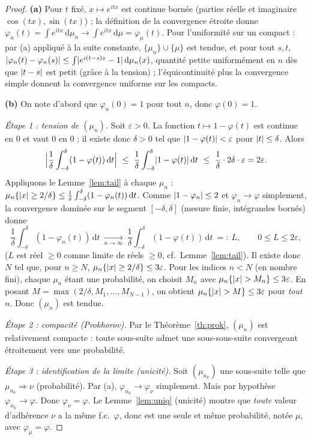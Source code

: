 \documentclass[11pt]{article}
\newcommand{\dd}{\,\mathrm{d}}
\newcommand{\weak}{\Rightarrow}
\DeclarePairedDelimiter{\abs}{\lvert}{\rvert}
\theoremstyle{plain}
\theoremstyle{definition}
\theoremstyle{remark}
\begin{document}
\begin{proof}
\textbf{(a)} Pour $t$ fixé, $x\mapsto e^{itx}$ est continue bornée (parties réelle et imaginaire
$\cos(tx),\sin(tx)$) ; la définition de la convergence étroite donne
$\varphi_n(t)=\int e^{itx}\dd\mu_n\to\int e^{itx}\dd\mu=\varphi_\mu(t)$. Pour l'uniformité sur un
compact : par (a) appliqué à la suite constante, $\{\mu_n\}\cup\{\mu\}$ est tendue, et pour tout
$s,t$, $\abs{\varphi_n(t)-\varphi_n(s)}\le\int\abs{e^{i(t-s)x}-1}\dd\mu_n(x)$, quantité petite
uniformément en $n$ dès que $\abs{t-s}$ est petit (grâce à la tension) ; l'équicontinuité plus la
convergence simple donnent la convergence uniforme sur les compacts. \medskip

\noindent\textbf{(b)} On note d'abord que $\varphi_n(0)=1$ pour tout $n$, donc $\varphi(0)=1$.

\smallskip
\emph{Étape 1 : tension de $(\mu_n)$.} Soit $\varepsilon>0$. La fonction $t\mapsto1-\varphi(t)$ est
continue en $0$ et vaut $0$ en $0$ ; il existe donc $\delta>0$ tel que $\abs{1-\varphi(t)}<\varepsilon$
pour $\abs t\le\delta$. Alors
\[
\Big|\frac1\delta\int_{-\delta}^{\delta}(1-\varphi(t))\dd t\Big|
\ \le\ \frac1\delta\int_{-\delta}^{\delta}\abs{1-\varphi(t)}\dd t\ \le\ \frac1\delta\cdot2\delta\cdot\varepsilon
=2\varepsilon.
\]
Appliquons le Lemme~\ref{lem:tail} à chaque $\mu_n$ :
$\mu_n\{\abs x\ge2/\delta\}\le\frac1\delta\int_{-\delta}^{\delta}(1-\varphi_n(t))\dd t$. Comme
$\abs{1-\varphi_n}\le2$ et $\varphi_n\to\varphi$ simplement, la convergence dominée sur le segment
$[-\delta,\delta]$ (mesure finie, intégrandes bornés) donne
\[
\frac1\delta\int_{-\delta}^{\delta}(1-\varphi_n(t))\dd t\ \xrightarrow[n\to\infty]{}\
\frac1\delta\int_{-\delta}^{\delta}(1-\varphi(t))\dd t\ =:\ L,\qquad 0\le L\le2\varepsilon,
\]
($L$ est réel $\ge0$ comme limite de réels $\ge0$, cf.\ Lemme~\ref{lem:tail}). Il existe donc $N$ tel
que, pour $n\ge N$, $\mu_n\{\abs x\ge2/\delta\}\le3\varepsilon$. Pour les indices $n<N$ (en nombre
fini), chaque $\mu_n$ étant une probabilité, on choisit $M_n$ avec
$\mu_n\{\abs x>M_n\}\le3\varepsilon$. En posant $M=\max(2/\delta,M_1,\dots,M_{N-1})$, on obtient
$\mu_n\{\abs x> M\}\le3\varepsilon$ pour \emph{tout} $n$. Donc $(\mu_n)$ est tendue.

\smallskip
\emph{Étape 2 : compacité (Prokhorov).} Par le Théorème~\ref{th:prok}, $(\mu_n)$ est relativement
compacte : toute sous-suite admet une sous-sous-suite convergeant étroitement vers une probabilité.

\smallskip
\emph{Étape 3 : identification de la limite (unicité).} Soit $(\mu_{n_k})$ une sous-suite telle que
$\mu_{n_k}\weak\nu$ (probabilité). Par (a), $\varphi_{n_k}\to\varphi_\nu$ simplement. Mais par
hypothèse $\varphi_{n_k}\to\varphi$. Donc $\varphi_\nu=\varphi$. Le Lemme~\ref{lem:uniq} (unicité)
montre que \emph{toute} valeur d'adhérence $\nu$ a la même f.c.\ $\varphi$, donc est une seule et même
probabilité, notée $\mu$, avec $\varphi_\mu=\varphi$.


\end{proof}
\end{document}

